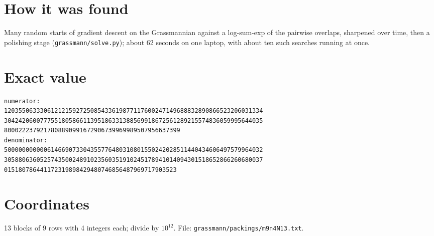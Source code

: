 \documentclass[11pt,a4paper]{article}
\begin{document}
\section{How it was found}
Many random starts of gradient descent on the Grassmannian against a log-sum-exp of the pairwise overlaps, sharpened over time, then a polishing stage (\texttt{grassmann/solve.py}); about 62 seconds on one laptop, with about ten such searches running at once.


\appendix
\section{Exact value}
{\small
\begin{verbatim}
numerator:
120355063330612121592725085433619877117600247149688832890866523206031334
304242060077755180586611395186331388569918672561289215574836059995644035
8000222379217808890991672906739969989507956637399
denominator:
500000000000614669073304355776480310801550242028511440434606497579964032
305880636052574350024891023560351910245178941014094301518652866260680037
015180786441172319898429480746856487969717903523
\end{verbatim}}

\section{Coordinates}
13 blocks of 9 rows with 4 integers each; divide by $10^{12}$. File: \texttt{grassmann/packings/m9n4N13.txt}.
{\tiny
\begin{multicols}{3}
\end{multicols}}
\end{document}
